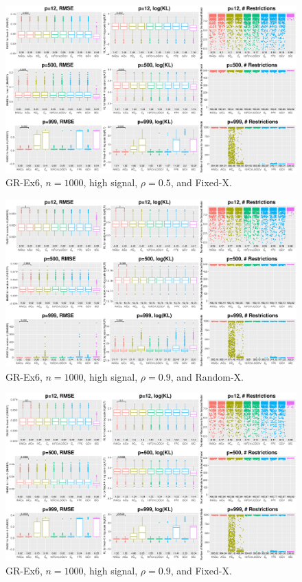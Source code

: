 \begin{figure}[!ht]
\centering
\includegraphics[width=\textwidth]{figures/supplement/fixedx_GR-Ex6_n1000_hsnr_rho05.eps}
\caption{GR-Ex6, $n=1000$, high signal, $\rho=0.5$, and Fixed-X.}
\end{figure}
\clearpage
\begin{figure}[!ht]
\centering
\includegraphics[width=\textwidth]{figures/supplement/randomx_GR-Ex6_n1000_hsnr_rho09.eps}
\caption{GR-Ex6, $n=1000$, high signal, $\rho=0.9$, and Random-X.}
\end{figure}
\begin{figure}[!ht]
\centering
\includegraphics[width=\textwidth]{figures/supplement/fixedx_GR-Ex6_n1000_hsnr_rho09.eps}
\caption{GR-Ex6, $n=1000$, high signal, $\rho=0.9$, and Fixed-X.}
\end{figure}
